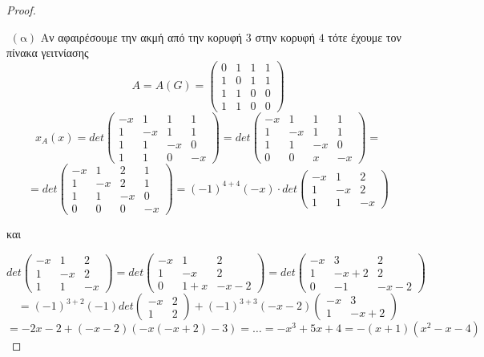 \documentclass[oneside,a4paper]{article}
\begin{document}
\begin{proof} $ $

	$ $\newline
	$(\text{α})$ Αν αφαιρέσουμε την ακμή από την κορυφή $3$ στην κορυφή $4$ τότε έχουμε τον πίνακα γειτνίασης
	$$A = A(G) = \begin{pmatrix}
		0 & 1 & 1 & 1 \\
		1 & 0 & 1 & 1 \\
		1 & 1 & 0 & 0 \\
		1 & 1 & 0 & 0
	\end{pmatrix}$$
	$$x_A (x) = det \begin{pmatrix}
		-x & 1 & 1 & 1 \\
		1 & -x & 1 & 1 \\
		1 & 1 & -x & 0 \\
		1 & 1 & 0 & -x
	\end{pmatrix} = det \begin{pmatrix}
		-x & 1 & 1 & 1 \\
		1 & -x & 1 & 1 \\
		1 & 1 & -x & 0 \\
		0 & 0 & x & -x
	\end{pmatrix} = $$
	$$ = det \begin{pmatrix}
		-x & 1 & 2 & 1 \\
		1 & -x & 2 & 1 \\
		1 & 1 & -x & 0 \\
		0 & 0 & 0 & -x
	\end{pmatrix} = (-1)^{4+4} (-x) \cdot det \begin{pmatrix}
		-x & 1 & 2\\
		1 &-x & 2 \\
		1 & 1 & -x
	\end{pmatrix}$$

	και 
	
	$$det \begin{pmatrix}
		-x & 1 & 2\\
		1 &-x & 2 \\
		1 & 1 & -x
	\end{pmatrix} = det \begin{pmatrix}
		-x & 1 & 2\\
		1 &-x & 2 \\
		0 & 1+x & -x-2
	\end{pmatrix} = det \begin{pmatrix}
		-x & 3 & 2\\
		1 &-x+2 & 2 \\
		0 & -1 & -x-2
	\end{pmatrix}$$
	$$=(-1)^{3+2}(-1) det\begin{pmatrix}
		-x & 2\\
		1 & 2
	\end{pmatrix} + (-1)^{3+3} (-x-2) \begin{pmatrix}
		-x & 3\\
		1 & -x+2
	\end{pmatrix} $$
	$$= -2x-2 + (-x-2)(-x(-x+2)-3) = \ldots = -x^3 +5x +4 = -(x+1)(x^2-x-4)$$


\end{proof}
\end{document}

